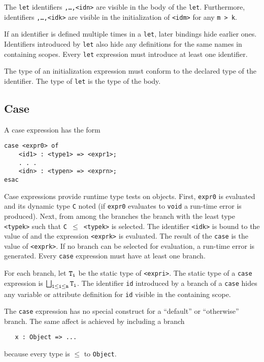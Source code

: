 The {\tt let} identifiers {\tt <id1>,\ldots,<idn>} are visible in the
body of the {\tt let}.  Furthermore, identifiers {\tt <id1>,\ldots,<idk>} are
visible in the initialization of {\tt <idm>} for any {\tt m > k}.

If an identifier is defined multiple times in a {\tt let}, later
bindings hide earlier ones.  Identifiers introduced by {\tt let} also
hide any definitions for the same names in containing scopes.
Every {\tt let} expression must introduce at least one identifier.

The type of an initialization expression must conform to
the declared type of the identifier.  The type of {\tt let} is the type
of the body.

\subsection{Case}
A case expression has the form
\begin{verbatim}
case <expr0> of 
    <id1> : <type1> => <expr1>; 
    . . .
    <idn> : <typen> => <exprn>; 
esac
\end{verbatim}
Case expressions provide runtime type tests on objects. 
First, {\tt expr0} is evaluated and its dynamic type {\tt C} noted
(if {\tt expr0} evaluates to {\tt void} a run-time error is produced).
Next, from among the branches the branch with the least type
{\tt <typek>} such that {\tt C $\leq$ <typek>} is selected. The identifier
{\tt <idk>} is bound to the
value of {\tt <expr0>} and the expression {\tt <exprk>} is evaluated.
The result of the {\tt case} is the value of {\tt <exprk>}.
If no branch can be selected for evaluation, a run-time error is generated.
Every {\tt case} expression must have at least one branch.


For each branch, let $\tt T_i$ be the static type of {\tt <expri>}.
The static type of a {\tt case} expression is $\tt \bigsqcup_{1 \leq i \leq
n} T_i$.
The identifier {\tt id} introduced by a branch of a {\tt case} hides any 
variable or attribute definition for {\tt id} visible in the containing scope.

The {\tt case} expression has no special construct for a ``default'' or
``otherwise'' branch.  The same affect is achieved by including a branch
\begin{verbatim}
   x : Object => ...
\end{verbatim}
because every type is $\leq$ to {\tt Object}.

